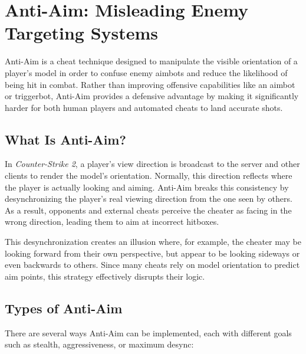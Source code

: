 \section{Anti-Aim: Misleading Enemy Targeting Systems}

Anti-Aim is a cheat technique designed to manipulate the visible orientation of a player’s model in order to confuse enemy aimbots and reduce the likelihood of being hit in combat. Rather than improving offensive capabilities like an aimbot or triggerbot, Anti-Aim provides a defensive advantage by making it significantly harder for both human players and automated cheats to land accurate shots.

\subsection{What Is Anti-Aim?}

In \textit{Counter-Strike 2}, a player's view direction is broadcast to the server and other clients to render the model's orientation. Normally, this direction reflects where the player is actually looking and aiming. Anti-Aim breaks this consistency by desynchronizing the player's real viewing direction from the one seen by others. As a result, opponents and external cheats perceive the cheater as facing in the wrong direction, leading them to aim at incorrect hitboxes.

This desynchronization creates an illusion where, for example, the cheater may be looking forward from their own perspective, but appear to be looking sideways or even backwards to others. Since many cheats rely on model orientation to predict aim points, this strategy effectively disrupts their logic.

\subsection{Types of Anti-Aim}

There are several ways Anti-Aim can be implemented, each with different goals such as stealth, aggressiveness, or maximum desync:


